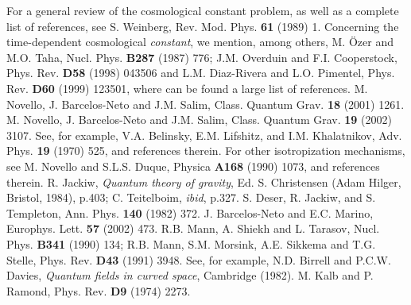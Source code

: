 \documentclass[a4paper,twocolumn,prd,groupedaddress,nofootinbib,showpacs]
{revtex4}
\begin{document}
\begin{thebibliography}{100}
 For a general review of the cosmological constant
problem, as well as a complete list of references, see S. Weinberg,
Rev. Mod. Phys. {\bf61} (1989) 1.
 Concerning the time-dependent cosmological {\it
constant}, we mention, among others, M. \"Ozer and M.O. Taha, Nucl.
Phys. {\bf B287} (1987) 776; J.M. Overduin and F.I. Cooperstock, Phys.
Rev. {\bf D58} (1998) 043506 and L.M. Diaz-Rivera and L.O. Pimentel,
Phys. Rev. {\bf D60} (1999) 123501, where can be found a large list of
references.
 M. Novello, J. Barcelos-Neto and J.M. Salim, Class.
Quantum Grav. {\bf18} (2001) 1261.
 M. Novello, J. Barcelos-Neto and J.M. Salim, Class.
Quantum Grav. {\bf19} (2002) 3107.
 See, for example, V.A. Belinsky, E.M. Lifshitz, and
I.M. Khalatnikov, Adv. Phys. {\bf19} (1970) 525, and references
therein.
 For other isotropization mechanisms, see M. Novello
and S.L.S. Duque, Physica {\bf A168} (1990) 1073, and references
therein.
 R. Jackiw, {\it Quantum theory of gravity}, Ed. S.
Christensen (Adam Hilger, Bristol, 1984), p.403; C. Teitelboim, {\it
ibid}, p.327.
 S. Deser, R. Jackiw, and S. Templeton, Ann. Phys.
{\bf140} (1982) 372.
 J. Barcelos-Neto and E.C. Marino, Europhys. Lett.
{\bf57} (2002) 473.
 R.B. Mann, A. Shiekh and L. Tarasov, Nucl. Phys. {\bf
B341} (1990) 134; R.B. Mann, S.M. Morsink, A.E. Sikkema and T.G.
Stelle, Phys. Rev. {\bf D43} (1991) 3948.
 See, for example, N.D. Birrell and P.C.W. Davies,
{\it Quantum fields in curved space}, Cambridge (1982).
 M. Kalb and P. Ramond, Phys. Rev. {\bf D9} (1974) 2273.
\end{thebibliography}
\end{document}
